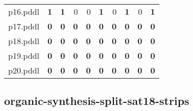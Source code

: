 \documentclass{article}
\begin{document}
\begin{tabular}{@{}lrrrrrrrrr@{}}
p16.pddl & \textbf{1} & \textbf{1} & 0 & 0 & \textbf{1} & 0 & \textbf{1} & 0 & \textbf{1} \\
p17.pddl & \textbf{0} & \textbf{0} & \textbf{0} & \textbf{0} & \textbf{0} & \textbf{0} & \textbf{0} & \textbf{0} & \textbf{0} \\
p18.pddl & \textbf{0} & \textbf{0} & \textbf{0} & \textbf{0} & \textbf{0} & \textbf{0} & \textbf{0} & \textbf{0} & \textbf{0} \\
p19.pddl & \textbf{0} & \textbf{0} & \textbf{0} & \textbf{0} & \textbf{0} & \textbf{0} & \textbf{0} & \textbf{0} & \textbf{0} \\
p20.pddl & \textbf{0} & \textbf{0} & \textbf{0} & \textbf{0} & \textbf{0} & \textbf{0} & \textbf{0} & \textbf{0} & \textbf{0} \\
\end{tabular}

\hypertarget{coverage-organic-synthesis-split-sat18-strips}{}
\subsection*{organic-synthesis-split-sat18-strips}
\end{document}
